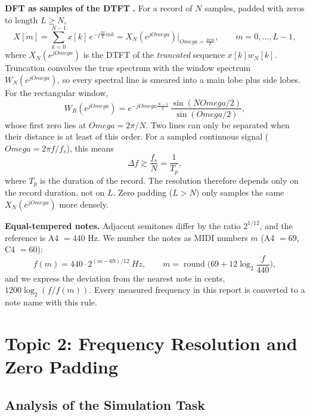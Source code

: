 \documentclass[12pt, a4paper]{article}
\def\text#1{#1}%
\def\Omega{Omega}%
\begin{document}
\textbf{DFT as samples of the DTFT} \cite{oppenheim,proakis}\textbf{.} For a record of $N$ samples, padded with zeros to length $L\ge N$,
\begin{equation}
    X[m]=\sum_{k=0}^{N-1}x[k]\,e^{-j\frac{2\pi}{L}mk}=X_N(e^{j\Omega})\Big|_{\Omega=\frac{2\pi m}{L}},\qquad m=0,\dots,L-1,
\end{equation}
where $X_N(e^{j\Omega})$ is the DTFT of the \emph{truncated} sequence $x[k]w_N[k]$. Truncation convolves the true spectrum with the window spectrum $W_N(e^{j\Omega})$, so every spectral line is smeared into a main lobe plus side lobes. For the rectangular window,
\begin{equation}
    W_R(e^{j\Omega})=e^{-j\Omega\frac{N-1}{2}}\,\frac{\sin(N\Omega/2)}{\sin(\Omega/2)},
\end{equation}
whose first zero lies at $\Omega=2\pi/N$. Two lines can only be separated when their distance is at least of this order. For a sampled continuous signal ($\Omega=2\pi f/f_s$), this means
\begin{equation}
    \Delta f \gtrsim \frac{f_s}{N}=\frac{1}{T_p},
\end{equation}
where $T_p$ is the duration of the record. The resolution therefore depends only on the record duration, not on $L$. Zero padding ($L>N$) only samples the same $X_N(e^{j\Omega})$ more densely.

\textbf{Equal-tempered notes.} Adjacent semitones differ by the ratio $2^{1/12}$, and the reference is A4 $=440$ Hz. We number the notes as MIDI numbers $m$ (A4 $=69$, C4 $=60$):
\begin{equation}
    f(m)=440\cdot 2^{(m-69)/12}\ \text{Hz},\qquad m=\operatorname{round}\!\Big(69+12\log_2\frac{f}{440}\Big),
\end{equation}
and we express the deviation from the nearest note in cents, $1200\log_2(f/f(m))$. Every measured frequency in this report is converted to a note name with this rule.

\section{Topic 2: Frequency Resolution and Zero Padding}

\subsection{Analysis of the Simulation Task}
\end{document}
